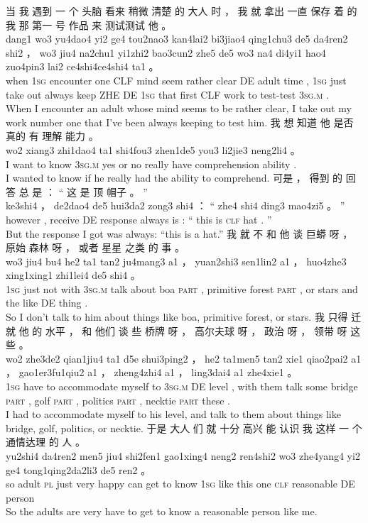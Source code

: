\documentclass[UTF8]{ctexart}
\begin{document}
\begin{exe}
当 我 遇到 一 个 头脑 看来 稍微 清楚 的 大人 时 ， 我 就 拿出 一直 保存 着 的 我 那 第一 号 作品 来 测试测试 他 。
\\
dang1 wo3 yu4dao4 yi2 ge4 tou2nao3 kan4lai2 bi3jiao4 qing1chu3 de5 da4ren2 shi2 ， wo3 jiu4 na2chu1 yi1zhi2 bao3cun2 zhe5 de5 wo3 na4 di4yi1 hao4 zuo4pin3 lai2 ce4shi4ce4shi4 ta1 。
\\
when \textsc{1sg} encounter one CLF mind seem rather  clear  DE adult time , \textsc{1sg} just {take out} always keep   ZHE DE \textsc{1sg}  that first CLF  work  to   test-test \textsc{3sg.m} .
\\
\trans When I encounter an adult whose mind seems to be rather clear, I take out my work number one that I've been always keeping to test him.
\ex
\glll
我 想 知道 他 是否 真的 有 理解 能力 。
\\
wo2 xiang3 zhi1dao4 ta1 shi4fou3 zhen1de5 you3 li2jie3 neng2li4 。
\\
I {want to} know \textsc{3sg.m} {yes or no} really have comprehension ability .
\\
\trans I wanted to know if he really had the ability to comprehend. 
\ex
\glll
可是 ， 得到 的 回答 总 是 ： “ 这 是 顶 帽子 。 ”
\\
ke3shi4 ， de2dao4 de5 hui3da2 zong3 shi4 ： “ zhe4 shi4 ding3 mao4zi5 。 ”
\\
however , receive DE response always is : `` this is \textsc{clf} hat . ''
\\
\trans But the response I got was always: ``this is a hat.''
\ex
\glll
我 就 不 和 他 谈 巨蟒 呀 ， 原始 森林 呀 ， 或者 星星 之类 的 事 。
\\
wo3 jiu4 bu4 he2 ta1 tan2 ju4mang3 a1 ， yuan2shi3 sen1lin2 a1 ， huo4zhe3 xing1xing1 zhi1lei4 de5 shi4 。
\\
\textsc{1sg} just not with \textsc{3sg.m} {talk about} boa \textsc{part} , primitive forest \textsc{part} , or stars {and the like} DE thing .
\\
\trans So I don't talk to him about things like boa, primitive forest, or stars. 
\ex
\glll
我 只得 迁就 他 的 水平 ， 和 他们 谈 些 桥牌 呀 ， 高尔夫球 呀 ， 政治 呀 ， 领带 呀 这些 。
\\
wo2 zhe3de2 qian1jiu4 ta1 d5e shui3ping2 ， he2 ta1men5 tan2 xie1 qiao2pai2 a1 ， gao1er3fu1qiu2 a1 ， zheng4zhi4 a1 ， ling3dai4 a1 zhe4xie1 。
\\
\textsc{1sg} {have to} {accommodate myself to} \textsc{3sg.m} DE level , with them  talk some bridge \textsc{part} , golf \textsc{part} , politics \textsc{part} , necktie \textsc{part} these .
\\
\trans I had to accommodate myself to his level, and talk to them about things like bridge, golf, politics, or necktie. 
\ex
\glll
于是 大人 们 就 十分 高兴 能 认识 我 这样 一 个 通情达理 的 人 。
\\
yu2shi4 da4ren2 men5 jiu4 shi2fen1 gao1xing4 neng2 ren4shi2 wo3 zhe4yang4 yi2 ge4 tong1qing2da2li3 de5 ren2 。
\\
so adult \textsc{pl} just very happy can {get to know} \textsc{1sg}  {like this} one \textsc{clf} reasonable DE person
\\
\trans So the adults are very have to get to know a reasonable person like me. 
\end{exe}
\end{document}
